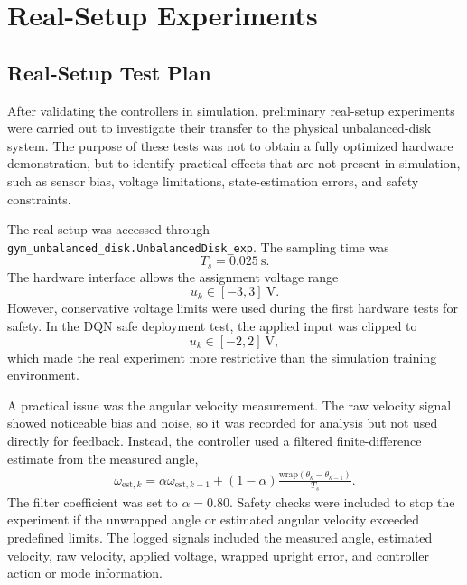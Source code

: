 \section{Real-Setup Experiments}

\subsection{Real-Setup Test Plan}

After validating the controllers in simulation, preliminary real-setup
experiments were carried out to investigate their transfer to the physical
unbalanced-disk system. The purpose of these tests was not to obtain a fully
optimized hardware demonstration, but to identify practical effects that are
not present in simulation, such as sensor bias, voltage limitations,
state-estimation errors, and safety constraints.

The real setup was accessed through
\texttt{gym\_unbalanced\_disk.UnbalancedDisk\_exp}. The sampling time was
\begin{equation}
    T_s = 0.025~\mathrm{s}.
\label{eq:real_sampling_time}
\end{equation}
The hardware interface allows the assignment voltage range
\begin{equation}
    u_k \in [-3,3]~\mathrm{V}.
\label{eq:real_voltage_range}
\end{equation}
However, conservative voltage limits were used during the first hardware tests
for safety. In the DQN safe deployment test, the applied input was clipped to
\begin{equation}
    u_k \in [-2,2]~\mathrm{V},
\label{eq:real_dqn_safe_voltage}
\end{equation}
which made the real experiment more restrictive than the simulation training
environment.

A practical issue was the angular velocity measurement. The raw velocity signal
showed noticeable bias and noise, so it was recorded for analysis but not used
directly for feedback. Instead, the controller used a filtered finite-difference
estimate from the measured angle,
\begin{equation}
\begin{aligned}
    \omega_{\mathrm{est},k}
    =
    \alpha \omega_{\mathrm{est},k-1}
    +
    (1-\alpha)
    \frac{\mathrm{wrap}(\theta_k-\theta_{k-1})}{T_s}.
\end{aligned}
\label{eq:real_velocity_estimate}
\end{equation}
The filter coefficient was set to \(\alpha=0.80\).
Safety checks were included to stop the experiment if the unwrapped angle or
estimated angular velocity exceeded predefined limits. The logged signals
included the measured angle, estimated velocity, raw velocity, applied voltage,
wrapped upright error, and controller action or mode information.

